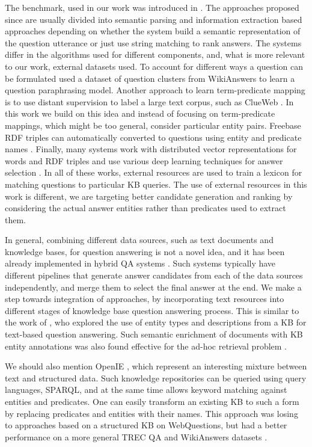 The benchmark, used in our work was introduced in \cite{Berant:EMNLP13}.
The approaches proposed since are usually divided into semantic parsing \cite{Berant:EMNLP13,berant2014semantic,berant2015imitation} and information extraction \cite{yao2014information,yao-scratch-qa-naacl2015,yao2014freebase,yih2015semantic,yu2014deep} based approaches depending on whether the system build a semantic representation of the question utterance or just use string matching to rank answers.
The systems differ in the algorithms used for different components, and, what is more relevant to our work, external datasets used.
To account for different ways a question can be formulated \cite{berant2014semantic} used a dataset of question clusters from WikiAnswers to learn a question paraphrasing model.
Another approach to learn term-predicate mapping is to use distant supervision \cite{mintz2009distant} to label a large text corpus, such as ClueWeb \cite{yao2014information}.
In this work we build on this idea and instead of focusing on term-predicate mappings, which might be too general, consider particular entity pairs.
Freebase RDF triples can automatically converted to questions using entity and predicate names \cite{BordesCW14:emnlp}.
Finally, many systems work with distributed vector representations for words and RDF triples and use various deep learning techniques for answer selection \cite{BordesCW14:emnlp,yih2015semantic}.
In all of these works, external resources are used to train a lexicon for matching questions to particular KB queries.
The use of external resources in this work is different, we are targeting better candidate generation and ranking by considering the actual answer entities rather than predicates used to extract them.

In general, combining different data sources, such as text documents and knowledge bases, for question answering is not a novel idea, and it has been already implemented in hybrid QA systems \cite{baudivs2015modeling,Barker12}.
Such systems typically have different pipelines that generate answer candidates from each of the data sources independently, and merge them to select the final answer at the end.
We make a step towards integration of approaches, by incorporating text resources into different stages of knowledge base question answering process.
This is similar to the work of \cite{Sun:2015:ODQ:2736277.2741651}, who explored the use of entity types and descriptions from a KB for text-based question answering.
Such semantic enrichment of documents with KB entity annotations was also found effective for the ad-hoc retrieval problem \cite{dalton2014entity}.

We should also mention OpenIE \cite{fader2011identifying}, which represent an interesting mixture between text and structured data.
Such knowledge repositories can be queried using query languages, \eg SPARQL, and at the same time allows keyword matching against entities and predicates.
One can easily transform an existing KB to such a form by replacing predicates and entities with their names.
This approach was losing to approaches based on a structured KB on WebQuestions, but had a better performance on a more general TREC QA and WikiAnswers datasets \cite{Fader:2014:OQA:2623330.2623677}.
